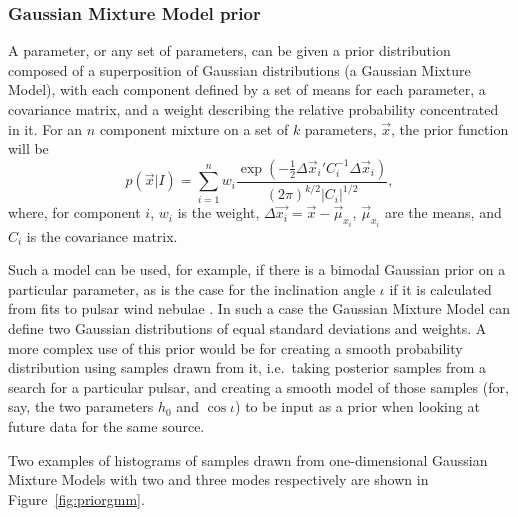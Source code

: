 \subsubsection{Gaussian Mixture Model prior}\label{sec:gmmprior}

A parameter, or any set of parameters, can be given a prior distribution composed of a superposition of Gaussian distributions (a
Gaussian Mixture Model), with each component defined by a set of means for each parameter, a covariance matrix, and a weight
describing the relative probability concentrated in it. For an $n$ component mixture on a set of $k$ parameters, $\vec{x}$, the prior
function will be
\begin{equation}
 p(\vec{x}|I) = \sum_{i=1}^n w_i\frac{\exp{\left(-\frac{1}{2}{\Delta\vec{x}_i}'C_i^{-1}\Delta\vec{x}_i\right)}}{(2\pi)^{k/2}|C_i|^{1/2}},
\end{equation}
where, for component $i$, $w_i$ is the weight, $\Delta\vec{x_i}= \vec{x}-\vec{\mu}_{x_i}$, $\vec{\mu}_{x_i}$ are the means, and
$C_i$ is the covariance matrix.

Such a model can be used, for example, if there is a bimodal Gaussian prior on a particular parameter, as is the case for the
inclination angle $\iota$ if it is calculated from fits to pulsar wind nebulae \citep[see, e.g., Appendix B in][]{2017arXiv170107709T}. In such a case the Gaussian Mixture Model can define
two Gaussian distributions of equal standard deviations and weights. A more complex use of this prior would be for creating a smooth
probability distribution using samples drawn from it, i.e.\ taking posterior samples from a search for a particular pulsar, and
creating a smooth model of those samples (for, say, the two parameters $h_0$ and $\cos{\iota}$) to be input as a prior when looking
at future data for the same source.

Two examples of histograms of samples drawn from one-dimensional Gaussian Mixture Models with two and three modes respectively
are shown in Figure~\ref{fig:priorgmm}.

